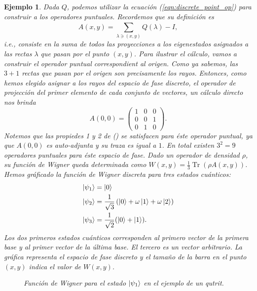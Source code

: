 \documentclass[a4paper]{report}
\DeclareMathOperator{\Tr}{Tr}
\newtheorem{example}{Ejemplo}
\begin{document}
\begin{example}
    Dada $Q$, podemos utilizar la ecuación
    (\ref{eqn:discrete_point_op}) para construir a los
    operadores puntuales. Recordemos que su definición es
    \[
      A(x,y) = \sum_{\lambda \ni (x,y)}^{} Q(\lambda) - I,
    \] 
    i.e., consiste en la suma de todos las proyecciones a
    los eigenestados asignados a las rectas $\lambda$ que
    pasan por el punto $(x,y)$. Para ilustrar el cálculo,
    vamos a construir el operador puntual correspondient al
    origen. Como ya sabemos, las $3+1$ rectas que pasan por
    el origen son precisamente los rayos. Entonces, como
    hemos elegido asignar a los rayos del espacio de fase
    discreto, el operador de projección del primer elemento
    de cada conjunto de vectores, un cálculo directo nos
    brinda
    \begin{equation}
      A(0,0)
      = \begin{pmatrix}
        1 & 0 & 0 \\
        0 & 0 & 1 \\
        0 & 1 & 0
      \end{pmatrix}. 
    \end{equation}
    Notemos que las propiedes 1 y 2 de () se satisfacen para
    éste operador puntual, ya que $A(0,0)$ es auto-adjunta y
    su traza es igual a $1$. En total existen $3^2 = 9$ 
    operadores puntuales para éste espacio de fase. Dado un
    operador de densidad $\rho$, su función de Wigner queda
    determinada como $W(x,y) = \frac{1}{3} \Tr(\rho
    A(x,y))$. Hemos gráficado la función de Wigner discreta
    para tres estados cuánticos:
    \begin{align}
      \ket{\psi_1}
      &= \ket 0 \\ 
      \ket{\psi_2}
      &= \frac{1}{\sqrt{3}}
      \left(
        \ket 0 + \omega \ket 1 + \omega \ket 2
      \right) \\
      \ket{\psi_3}
      &= \frac{1}{\sqrt{2}} (\ket 0 + \ket 1).
    \end{align}
    Los dos primeros estados cuánticos corresponden al
    primero vector de la primera base y al primer vector de
    la última base. El tercero es un vector arbitrario. La
    gráfica representa el espacio de fase discreto y el
    tamaño de la barra en el punto $(x,y)$ indica el valor
    de $W(x,y)$.

    \begin{figure}[ht]
      \centering
      \scalebox{0.7}{
        
      }
      \caption{Función de Wigner para el estado
        $\ket{\psi_1}$ en el ejemplo de un qutrit.}
      \label{fig:wigner-desargues-3-1-s1}
    \end{figure}


\end{example}
\end{document}
